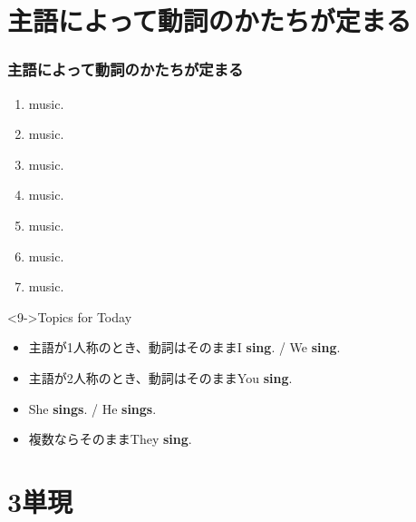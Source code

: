 \documentclass[aspectratio=169,xcolor={dvipsnames,table}]{beamer}
\begin{document}
\section{主語によって動詞のかたちが定まる}
\begin{frame}[plain]\frametitle{主語によって動詞のかたちが定まる}
  \begin{enumerate}
   \item<1->   music. \hfill{}
   \item<1->   music.
   \item<1->   music.
   \item<1->   music.
   \item<1->   music.
   \item<1->   music.
   \item<1->   music.
  \end{enumerate}
\begin{block}<9->{Topics for Today}\small
\begin{itemize}[square]
 \item<10-> 主語が1人称のとき、動詞はそのまま\hfill{I \textbf{sing}. / We \textbf{sing}.}
 \item<11-> 主語が2人称のとき、動詞はそのまま\hfill{You \textbf{sing}.}
 \item<12-> \hfill{She \textbf{sings}. / He \textbf{sings}.}
 \item<13->[] \hspace{96pt}複数ならそのまま\hfill{They \textbf{sing}.}
\end{itemize}
      \end{block}
\end{frame}
\section{3単現}
\end{document}
